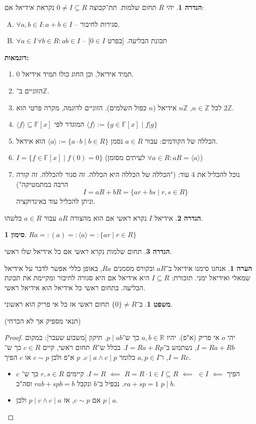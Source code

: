 \documentclass[a4paper]{article}
\newcommand\Z     {\mathbb{Z}}
\newcommand\R     {\mathbb{R}}
\newcommand\ra    {\rangle}
\newcommand\la    {\langle}
\newcommand\F         {\mathbb{F}}
\newcommand\co        {\colon}
\theoremstyle{definition}
\newtheorem{Theorem}{\color{myblue}משפט}
\newtheorem{Definition}{\color{mygreen}הגדרה}
\newtheorem{Remark}{\color{mycyan}הערה}
\newtheorem{Notion}{\color{myred}סימון}
\newcommand\theo  [1] {\begin{Theorem}#1\end{Theorem}}
\newcommand\defi  [1] {\begin{Definition}#1\end{Definition}}
\newcommand\rmark [1] {\begin{Remark}#1\end{Remark}}
\newcommand\noti  [1] {\begin{Notion}#1\end{Notion}}
\begin{document}
	\defi{יהי $R$ תחום שלמות. תת־קבוצה $0 \neq I \subseteq R$ נקראת \textit{אידיאל} אם: 
		\begin{enumerate}[A.]
			\item $\forall a, b \in I \co a + b \in I$ – סגירות לחיבור. 
			\item $\forall a \in I \, \forall b \in R \co ab \in I$ – תכונת הבליעה. [בפרט $0 \in I$]
	\end{enumerate}}
	\textbf{דוגמאות: }\begin{enumerate}
		\item $0$ תמיד אידיאל, וכן החוג כולו תמיד אידיאל. 
		\item הזוגיים ב־$\Z$. 
		\item לכל $n \in \Z$, $n\Z$ אידיאל ($n$ כפול השלמים). הזוגיים לדוגמה, מקרה פרטי הוא $2\Z$. 
		\item $\la f \ra \subseteq \F[x]$ המוגדר לפי $\la f \ra := \{g \in \F[x] \mid f|g\}$
		\item הכללה של הקודמים: עבור $a \in R$ נסמן $\la a \ra := \{a \cdot b \mid b \in R\}$ הוא אידאל. 
		\item $I = \{f \in \F[x] \mid f(0) = 0\}$ (לעיתים מסומן $\forall a \in R \co aR = \la a \ra$)
		\item נוכל להכליל את 4 עוד: ("הכללה של הכללה היא הכללה. זה סגור להכללה. זה קורה הרבה במתמטיקה")
		\[ I = aR + bR = \{ar + bs \mid r, s \in R\} \]
		וניתן להכליל עוד באינדוקציה. 
	\end{enumerate}
	\defi{אידיאל $I$ נקרא \textit{ראשי} אם הוא מהצורה $aR$ עבור $a \in R$ כלשהו. }
	\noti{$ Ra =: (a) =: \la a \ra =: \{ar \mid r \in R\}$}
	\defi{תחום שלמות נקרא \textit{ראשי} אם כל אידיאל שלו ראשי. }
	
	\rmark{אנחנו סימנו אידיאל ב־$aR$ ובקורס מסמנים $Ra$, באופן כללי אפשר לדבר על אידיאל שמאלי ואידיאל ימני. תזכורת: $I \subseteq R$ היא אידיאל אם היא סגורה לחיבור ומקיימת את תכונת הבליעה. בתחום ראשי כל אידיאל הוא אידיאל ראשי. }
	
	\theo{ב־$\{0\} \neq R$ תחום ראשי אז כל אי פריק הוא ראשוני. }
	(תנאי מספיק אך לא הכרחי)
	\begin{proof}
		יהי $o$ אי פריק (א"פ). יהיו $a, b \in \R$ כך ש־$p \mid ab$. תיקון [משבוע שעבר]: במקום $I = Ra + Rb$, נשתמש ב־$I = Ra + Rp$. 
		בכלל ש־$R$ תחום ראשי, קיים $c \in R$ כך ש־$I = Rc$, ו־$a, p \in I$ כלומר $c \mid a \land c \mid p$. $p$ א"פ ולכן $c \sim p$ או $c$ הפיך. 
		\begin{itemize}
			\item $c$ הפיך $\impliedby$ $ \in I$ $\impliedby$ $R = R \cdot 1 \in I \subseteq R$ $\impliedby$ $I = R$. קיימים $r, s \in R$ כך ש־$ra + sp = 1$. נכפיל ב־$b$ ונקבל $rab + spb = b$ וסה"כ $p \mid b$. 
			\item אם $c \sim p$, אז $p \mid c \land c \mid a$ ולכן $p \mid a$. 
		\end{itemize}
	\end{proof}
	
\end{document}
